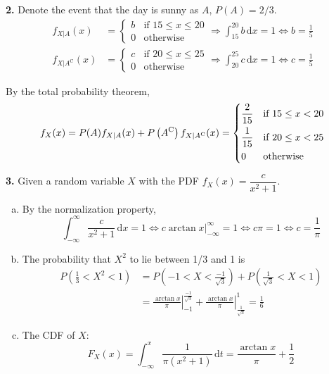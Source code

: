 \documentclass[a4paper,12pt]{article}
\newcommand{\C}{\mathrm C}
\newcommand{\ud}{\,\mathrm{d}}
\newcommand{\exercise}[1]{\noindent\textbf{#1.}}
\begin{document}
\exercise 2  Denote the event that the day is sunny as $A$, $P(A) = 2/3$.
\begin{align*}
  f_{X|A}(x) &= \begin{cases}
    b &\text{if }15 \le x \le 20\\
    0 &\text{otherwise}
  \end{cases}
  \Longrightarrow \int_{15}^{20}b\ud x = 1
  \iff b = \frac{1}{5}\\
  f_{X|A^\C}(x) &= \begin{cases}
    c &\text{if }20 \le x \le 25\\
    0 &\text{otherwise}
  \end{cases}
  \Longrightarrow \int_{20}^{25}c\ud x = 1
  \iff c = \frac{1}{5}
\end{align*}

By the total probability theorem,
\[f_X(x) = P(A)f_{X|A}(x) + P\left(A^\C\right)f_{X|A^\C}(x)
  = \begin{dcases}
    \frac{2}{15} &\text{if }15 \le x < 20\\
    \frac{1}{15} &\text{if }20 \le x < 25\\
    0 &\text{otherwise}
  \end{dcases}\]
\pagebreak

\exercise 3  Given a random variable $X$ with the PDF
$f_X(x) = \dfrac{c}{x^2 + 1}$.
\begin{enumerate}[(a)]
  \item By the normalization property,
    \[\int_{-\infty}^\infty\frac{c}{x^2 + 1}\ud x = 1
      \iff \left.c\arctan x\right|_{-\infty}^\infty = 1
      \iff c\pi = 1 \iff c = \frac{1}{\pi}\]
  \item The probability that $X^2$ to lie between 1/3 and 1 is
    \begin{align*}
      P\left(\frac{1}{3} < X^2 < 1\right)
      &= P\left(-1 < X < \frac{-1}{\sqrt 3}\right)
       + P\left(\frac{1}{\sqrt 3} < X < 1\right)\\
      &= \left.\frac{\arctan x}{\pi}\right|_{-1}^{\frac{-1}{\sqrt 3}}
       + \left.\frac{\arctan x}{\pi}\right|_{\frac{1}{\sqrt 3}}^{1}
       = \frac{1}{6}
    \end{align*}
  \item The CDF of $X$:
    \[F_X(x) = \int_{-\infty}^{x}\frac{1}{\pi\left(x^2 + 1\right)}\ud t
      = \frac{\arctan x}{\pi} + \frac{1}{2}\]
\end{enumerate}
\end{document}

